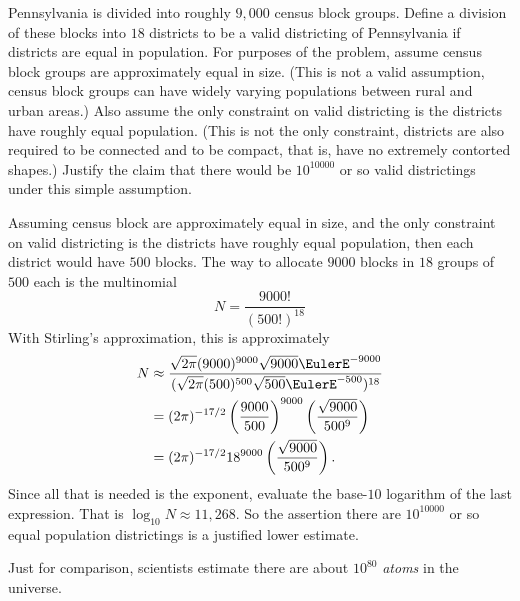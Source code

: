 \documentclass[12pt]{article}
\begin{document}
\begin{exercise}
    Pennsylvania is divided into roughly \( 9{,}000 \) census block
    groups. Define a division of these blocks into \( 18 \) districts to
    be a valid districting of Pennsylvania if districts are equal in
    population.  For purposes of the problem, assume census block groups
    are approximately equal in size.  (This is not a valid assumption,
    census block groups can have widely varying populations between
    rural and urban areas.) Also assume the only constraint on valid
    districting is the districts have roughly equal population.  (This
    is not the only constraint,  districts are also required to be
    connected and to be compact, that is, have no extremely contorted
    shapes.) Justify the claim that there would be \( 10^{10000} \) or
    so valid districtings under this simple assumption.
\end{exercise}

\begin{solution}
    Assuming census block are approximately equal in size, and the only
    constraint on valid districting is the districts have roughly equal
    population, then each district would have \( 500 \) blocks.  The way
    to allocate \( 9000 \) blocks in \( 18 \) groups of \( 500 \) each
    is the multinomial
    \[
        N = \frac{9000!}{(500!)^{18}}
    \] With Stirling's approximation, this is approximately
    \begin{align*}
        N &\approx \frac{\sqrt{2\pi} (9000)^{9000} \sqrt{9000} \EulerE^{-9000}}
        {(\sqrt{2\pi} (500)^{500} \sqrt{500} \EulerE^{-500})^{18}} \\
        &= (2\pi)^{-17/2} \left( \frac{9000}{500} \right)^{9000} \left(
        \frac{\sqrt{9000}}{500^{9}} \right) \\
        &= (2\pi)^{-17/2} 18^{9000} \left( \frac{\sqrt{9000}}{500^{9}}
        \right).  \\
    \end{align*}
    Since all that is needed is the exponent, evaluate the base-\( 10 \)
    logarithm of the last expression.  That is \( \log_{10} N \approx 11
    {,}268 \).  So the assertion there are \( 10^{10000} \) or so equal
    population districtings is a justified lower estimate.

    Just for comparison, scientists estimate there are about \( 10^{80} \)
    \emph{atoms} in the universe.
\end{solution}
\end{document}
